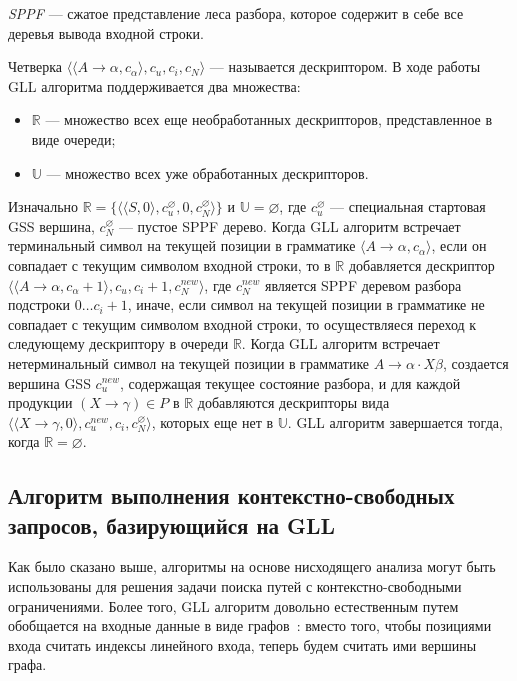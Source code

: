 \begin{rudefinition}
    \emph{SPPF} --- сжатое представление леса разбора, которое содержит в себе все деревья вывода входной строки. 
\end{rudefinition}

Четверка $\langle \langle A \rightarrow \alpha, c_{\alpha} \rangle, c_{u}, c_{i}, c_{N} \rangle$ --- называется дескриптором.
В ходе работы GLL алгоритма поддерживается два множества:
\begin{itemize}
    \item $\mathbb{R}$ --- множество всех еще необработанных дескрипторов, представленное в виде очереди;
    \item $\mathbb{U}$ --- множество всех уже обработанных дескрипторов.
\end{itemize}
Изначально $\mathbb{R} = \{ \langle \langle S, 0 \rangle, c_{u}^{\varnothing}, 0, c_{N}^{\varnothing} \rangle \}$ и $\mathbb{U} = \varnothing$,
где $c_{u}^{\varnothing}$ --- специальная стартовая GSS вершина, $c_{N}^{\varnothing}$ --- пустое SPPF дерево.
Когда GLL алгоритм встречает терминальный символ на текущей позиции в грамматике $\langle A \rightarrow \alpha, c_{\alpha} \rangle$, если он совпадает с текущим символом входной строки, то в $\mathbb{R}$ добавляется дескриптор $\langle \langle A \rightarrow \alpha, c_{\alpha} + 1 \rangle, c_{u}, c_{i} + 1, c_{N}^{new} \rangle$, где $c_{N}^{new}$ является SPPF деревом разбора подстроки $0 \dots c_{i} + 1$, иначе, если символ на текущей позиции в грамматике не совпадает с текущим символом входной строки, то осуществляеся переход к следующему дескриптору в очереди $\mathbb{R}$.
Когда GLL алгоритм встречает нетерминальный символ на текущей позиции в грамматике $A \rightarrow \alpha \cdot X \beta$, создается вершина GSS $c_{u}^{new}$, содержащая текущее состояние разбора, и для каждой продукции $(X \rightarrow \gamma) \in P$ в $\mathbb{R}$ добавляются дескрипторы вида $\langle \langle X \rightarrow \gamma, 0 \rangle, c_{u}^{new}, c_{i}, c_{N}^{\varnothing} \rangle$, которых еще нет в $\mathbb{U}$.
GLL алгоритм завершается тогда, когда $\mathbb{R} = \varnothing$.

\subsection{Алгоритм выполнения контекстно-свободных запросов, базирующийся на GLL}
Как было сказано выше, алгоритмы на основе нисходящего анализа могут быть использованы для решения задачи поиска путей с контекстно-свободными ограничениями.
Более того, GLL алгоритм довольно естественным путем обобщается на входные данные в виде графов~\cite{GLL2}: вместо того, чтобы позициями входа считать индексы линейного входа, теперь будем считать ими вершины графа. 

